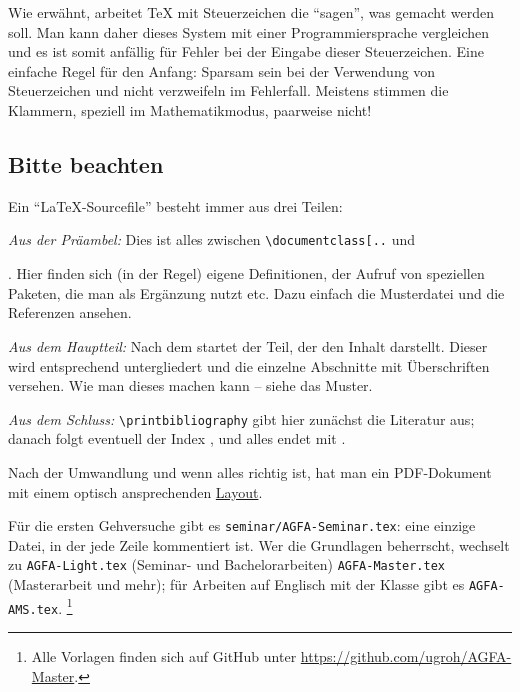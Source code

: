 Wie erwähnt, arbeitet \TeX{} mit Steuerzeichen die \enquote{sagen}, was gemacht werden soll.
Man kann daher dieses System mit einer Programmiersprache vergleichen und es ist somit anfällig für Fehler bei der Eingabe dieser Steuerzeichen. 
Eine einfache Regel für den Anfang: Sparsam sein bei der Verwendung von Steuerzeichen und nicht verzweifeln im Fehlerfall.
Meistens stimmen die Klammern, speziell im Mathematikmodus, paarweise nicht!

\subsection{Bitte beachten}
%
Ein \enquote{\LaTeX{}-Sourcefile} besteht immer aus drei Teilen:

\begin{myenumerate} 
	\item 
	\emph{Aus der Präambel:} Dies ist alles zwischen \verb|\documentclass[..| und \par
	\verb||.
	Hier finden sich (in der Regel) eigene Definitionen, der Aufruf von speziellen Paketen, die man als Ergänzung nutzt etc.
	Dazu einfach die Musterdatei und die Referenzen ansehen.
	
	\item
	\emph{Aus dem Hauptteil: } Nach dem \verb!! startet der Teil, der den Inhalt darstellt.
	Dieser wird entsprechend untergliedert und die einzelne Abschnitte mit Überschriften versehen.
	Wie man dieses machen kann -- siehe das Muster.
		
	\item
	\emph{Aus dem Schluss: } \verb!\printbibliography! gibt hier zunächst die Literatur aus; danach folgt eventuell der Index \etc, und alles endet mit \verb!!.
	
	\item
	Nach der Umwandlung und wenn alles richtig ist, hat man ein PDF-Dokument mit einem optisch ansprechenden \href{https://de.wikipedia.org/wiki/Layout}{Layout}.
\end{myenumerate}
%
Für die ersten Gehversuche gibt es \texttt{seminar/AGFA-Seminar.tex}: eine einzige Datei, in der jede Zeile kommentiert ist.
Wer die Grundlagen beherrscht, wechselt zu \texttt{AGFA-Light.tex} (Seminar- und Bachelorarbeiten) \bzw \texttt{AGFA-Master.tex} (Masterarbeit und mehr); für Arbeiten auf Englisch mit der Klasse  gibt es \texttt{AGFA-AMS.tex}.%
\footnote{Alle Vorlagen finden sich auf GitHub unter \url{https://github.com/ugroh/AGFA-Master}.}


